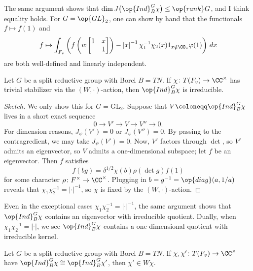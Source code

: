 \documentclass{article}
\begin{document}
\begin{remark}
	The same argument shows that $\dim J\big(\op{Ind}_B^G\chi\big)\le\op{rank}G$, and I think equality holds. For $G=\op{GL}_2$, one can show by hand that the functionals $f\mapsto f(1)$ and
	\[f\mapsto\int_{F_v}\left(f\left(w\begin{bmatrix}
		1 & x \\ & 1
	\end{bmatrix}\right)-\left|x\right|^{-1}\chi_1^{-1}\chi_2(x)1_{x\notin\OO_v}\varphi(1)\right)\,dx\]
	are both well-defined and linearly independent.
\end{remark}
\begin{proposition}
	Let $G$ be a split reductive group with Borel $B=TN$. If $\chi\colon T(F_v)\to\CC^\times$ has trivial stabilizer via the $(W,\cdot)$-action, then $\op{Ind}^G_B\chi$ is irreducible.
\end{proposition}
\begin{proof}[Sketch]
	We only show this for $G=\mathrm{GL}_2$. Suppose that $V\coloneqq\op{Ind}_B^G\chi$ lives in a short exact sequence
	\[0\to V'\to V\to V''\to0.\]
	For dimension reasons, $J_\psi(V')=0$ or $J_\psi(V'')=0$. By passing to the contragredient, we may take $J_\psi(V')=0$. Now, $V'$ factors through $\det$, so $V'$ admits an eigenvector, so $V$ admits a one-dimensional subspace; let $f$ be an eigenvector. Then $f$ satisfies
	\[f(bg)=\delta^{1/2}\chi(b)\rho(\det g)f(1)\]
	for some character $\rho\colon F^\times\to\CC^\times$. Plugging in $b=g^{-1}=\op{diag}(a,1/a)$ reveals that $\chi_1\chi_2^{-1}=\left|\cdot\right|^{-1}$, so $\chi$ is fixed by the $(W,\cdot)$-action.
\end{proof}
\begin{remark}
	Even in the exceptional cases $\chi_1\chi_2^{-1}=\left|\cdot\right|^{-1}$, the same argument shows that $\op{Ind}_B^G\chi$ contains an eigenvector with irreducible quotient. Dually, when $\chi_1\chi_2^{-1}=\left|\cdot\right|$, we see $\op{Ind}_B^G\chi$ contains a one-dimensional quotient with irreducible kernel.
\end{remark}
\begin{proposition}
	Let $G$ be a split reductive group with Borel $B=TN$. If $\chi,\chi'\colon T(F_v)\to\CC^\times$ have $\op{Ind}_B^G\chi\cong\op{Ind}_B^G\chi'$, then $\chi'\in W\chi$.
\end{proposition}
\end{document}
